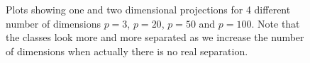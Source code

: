 \documentclass[12]{article}
\begin{document}
\begin{figure}[hbtp]
       \caption{Plots showing one and two dimensional projections for 4 different number of dimensions $p=3$, $p=20$, $p=50$ and $p=100$. Note that the classes look more and more separated as we increase the number of dimensions when actually there is no real separation.  }
       \label{dist_1d}
\end{figure}
\end{document}

